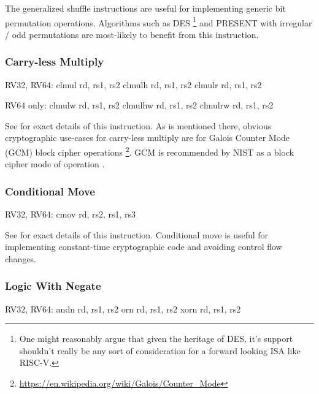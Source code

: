 The generalized shuffle instructions are useful for implementing
generic bit permutation operations.
Algorithms such as 
DES \footnote{
One might reasonably argue that given the heritage of DES, it's support
shouldn't really be any sort of consideration for a forward looking
ISA like RISC-V.
}
and
PRESENT\cite{block:present} with
irregular / odd permutations are most-likely to benefit from this
instruction.


\subsubsection{Carry-less Multiply}

\begin{isa}
RV32, RV64:
    clmul rd, rs1, rs2
    clmulh rd, rs1, rs2
    clmulr rd, rs1, rs2

RV64 only:
    clmulw rd, rs1, rs2
    clmulhw rd, rs1, rs2
    clmulrw rd, rs1, rs2
\end{isa}

See \cite[Section 2.6]{riscv:bitmanip:draft} for exact details of
this instruction.
As is mentioned there, obvious cryptographic use-cases for carry-less
multiply are for Galois Counter Mode (GCM) block cipher operations
\footnote{\url{https://en.wikipedia.org/wiki/Galois/Counter_Mode}}.
GCM is recommended by NIST as a block cipher mode of operation
\cite{nist:gcm}.

\subsubsection{Conditional Move}

\begin{isa}
RV32, RV64:
    cmov rd, rs2, rs1, rs3
\end{isa}

See \cite[Section 2.9.2]{riscv:bitmanip:draft} for exact details of
this instruction.
Conditional move is useful for implementing constant-time cryptographic
code and avoiding control flow changes.

\subsubsection{Logic With Negate}

\begin{isa}
RV32, RV64:
    andn rd, rs1, rs2
     orn rd, rs1, rs2
    xorn rd, rs1, rs2
\end{isa}

